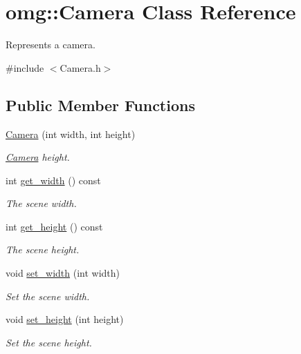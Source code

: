 \hypertarget{classomg_1_1_camera}{}\section{omg\+::Camera Class Reference}
\label{classomg_1_1_camera}


Represents a camera.  




{\ttfamily \#include $<$Camera.\+h$>$}

\subsection*{Public Member Functions}
\begin{DoxyCompactItemize}
\item 
\mbox{\label{classomg_1_1_camera_a6d9365a4e09140f3f9481045796c0fd9}} 
\mbox{\hyperlink{classomg_1_1_camera_a6d9365a4e09140f3f9481045796c0fd9}{Camera}} (int width, int height)
\begin{DoxyCompactList}\small\item\em \mbox{\hyperlink{classomg_1_1_camera}{Camera}} height. \end{DoxyCompactList}\item 
int \mbox{\hyperlink{classomg_1_1_camera_a9d27ce6b9428503ad27e0247deb65bba}{get\+\_\+width}} () const
\begin{DoxyCompactList}\small\item\em The scene width. \end{DoxyCompactList}\item 
int \mbox{\hyperlink{classomg_1_1_camera_a4003f1cf690980d47b3307e6eefe3003}{get\+\_\+height}} () const
\begin{DoxyCompactList}\small\item\em The scene height. \end{DoxyCompactList}\item 
void \mbox{\hyperlink{classomg_1_1_camera_a3ef1ff0d4ca0deb6b32b5e08d7dcb159}{set\+\_\+width}} (int width)
\begin{DoxyCompactList}\small\item\em Set the scene width. \end{DoxyCompactList}\item 
void \mbox{\hyperlink{classomg_1_1_camera_a75d3baca3bae25365e5d3dddc005676e}{set\+\_\+height}} (int height)
\begin{DoxyCompactList}\small\item\em Set the scene height. \end{DoxyCompactList}\end{DoxyCompactItemize}


